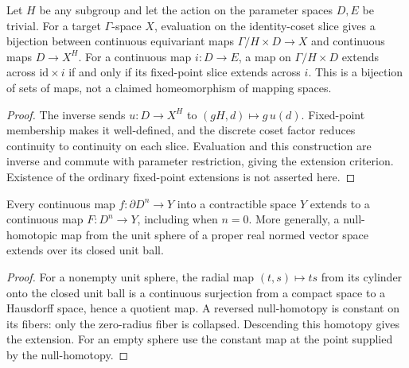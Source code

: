 \begin{proposition}\label{prop:orbit-cell-extension-reduction}
Let $H$ be any subgroup and let the action on the parameter spaces $D,E$ be
trivial. For a target $\Gamma$-space $X$, evaluation on the identity-coset slice
gives a bijection between continuous equivariant maps
$\Gamma/H\times D\to X$ and continuous maps $D\to X^H$.
For a continuous map $i:D\to E$, a map on $\Gamma/H\times D$ extends across
$\mathrm{id}\times i$ if and only if its fixed-point slice extends across $i$.
This is a bijection of sets of maps, not a claimed homeomorphism of mapping spaces.
\end{proposition}
\begin{proof}
\leanok
The inverse sends $u:D\to X^H$ to $(gH,d)\mapsto g\,u(d)$.
Fixed-point membership makes it well-defined, and the discrete coset factor
reduces continuity to continuity on each slice. Evaluation and this construction
are inverse and commute with parameter restriction, giving the extension
criterion. Existence of the ordinary fixed-point extensions is not asserted here.
\end{proof}


\begin{proposition}\label{prop:contractible-disk-extension}
Every continuous map $f:\partial D^n\to Y$ into a contractible space $Y$
extends to a continuous map $F:D^n\to Y$, including when $n=0$.
More generally, a null-homotopic map from the unit sphere of a proper real
normed vector space extends over its closed unit ball.
\end{proposition}
\begin{proof}
\leanok
For a nonempty unit sphere, the radial map $(t,s)\mapsto ts$ from its cylinder
onto the closed unit ball is a continuous surjection from a compact space to a
Hausdorff space, hence a quotient map. A reversed null-homotopy is constant
on its fibers: only the zero-radius fiber is collapsed. Descending this
homotopy gives the extension. For an empty sphere use the constant map at
the point supplied by the null-homotopy.
\end{proof}

